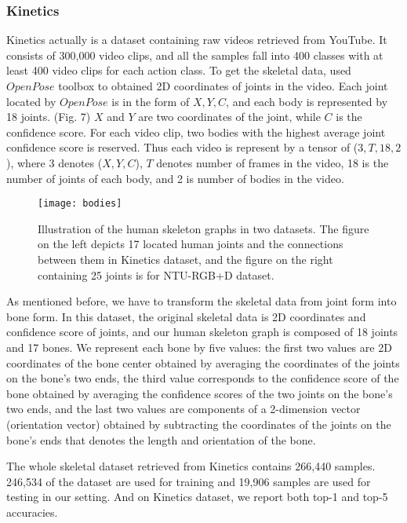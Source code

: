 \documentclass[a4paper,11pt]{article}
\begin{document}
\subsubsection{Kinetics}
Kinetics actually is a dataset containing raw videos retrieved from YouTube. It consists of 300,000 video clips, and all the samples fall into 400 classes with at least 400 video clips for each action class. To get the skeletal data, \cite{yan2018spatial} used $OpenPose$ toolbox \cite{cao2017realtime} to obtained 2D coordinates of joints in the video. Each joint located by $OpenPose$ is in the form of $X, Y, C$, and each body is represented by 18 joints. (Fig. 7) $X$ and $Y$ are two coordinates of the joint, while $C$ is the confidence score. For each video clip, two bodies with the highest average joint confidence score is reserved. Thus each video is represent by a tensor of ($3,T,18,2$), where 3 denotes ($X,Y,C$), $T$ denotes number of frames in the video, 18 is the number of joints of each body, and 2 is number of bodies in the video.

\begin{figure}
\centering
\texttt{[image: bodies]}
\caption{Illustration of the human skeleton graphs in two datasets. The figure on the left depicts 17 located human joints and the connections between them in Kinetics dataset, and the figure on the right containing 25 joints is for NTU-RGB+D dataset.}
\label{fig:example}
\end{figure}


As mentioned before, we have to transform the skeletal data from joint form into bone form. In this dataset, the original skeletal data is 2D coordinates and confidence score of joints, and our human skeleton graph is composed of 18 joints and 17 bones. We represent each bone by five values: the first two values are 2D coordinates of the bone center obtained by averaging the coordinates of the joints on the bone's two ends, the third value corresponds to the confidence score of the bone obtained by averaging the confidence scores of the two joints on the bone's two ends, and the last two values are components of a 2-dimension vector (orientation vector) obtained by subtracting the coordinates of the joints on the bone's ends that denotes the length and orientation of the bone.

The whole skeletal dataset retrieved from Kinetics contains 266,440 samples. 246,534 of the dataset are used for training and 19,906 samples are used for testing in our setting. And on Kinetics dataset, we report both top-1 and top-5 accuracies.
\end{document}
